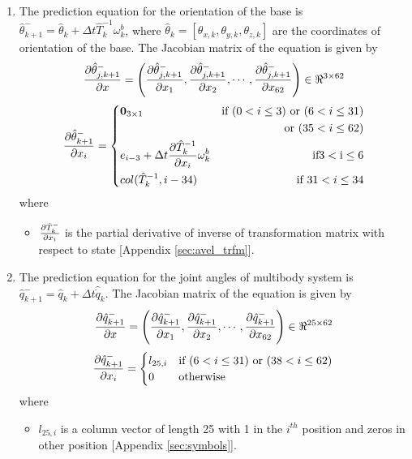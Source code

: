 \begin{enumerate}
\item The prediction equation for the orientation of the base is $\hat{\theta}_{k+1}^- = \hat{\theta}_k + \Delta t \hat T_k^{-1} \omega_k^b$, where $\hat \theta_k = [ \theta_{x,k},\theta_{y,k},\theta_{z,k}]$ are the coordinates of orientation of the base. The Jacobian matrix of the equation is given by
\begin{equation}
\label{eq:dthetadx}
\frac{\partial {\hat{\theta}_{j,k+1}^-}}{\partial {x}} = \left(\frac{\partial {\hat{\theta}_{j,k+1}^-}}{\partial {x_{1}}}, \frac{\partial {\hat{\theta}_{j,k+1}^-}}{\partial {x_{2}}}, \cdots , \frac{\partial {\hat{\theta}_{j,k+1}^-}}{\partial {x_{62}}}\right) \in \Re^{3 \times 62}
\end{equation}
\[
 \frac{\partial {\hat{\theta}_{k+1}^-}}{\partial {x_{i}}} = \left\lbrace
  \!\begin{aligned}
   &\textbf{0}_{3 \times 1} &\text{if }(0 < i \leq 3) \text{ or }(6 < i \leq 31) \\
   &\hspace{2cm} &\text{ or } (35 < i \leq 62) \\
   &e_{i-3} + \Delta t \frac{\partial {\hat T_k^{-1}}}{\partial {x_i}}\omega_k^b & \text{if}3< \text{i} \leq 6 \\
   &col(\hat T_k^{-1},i-34) & \text{if } 31 < i \leq 34 \\
  \end{aligned} \right.
\]where
\begin{itemize}
\item $\frac{\partial {\hat T_k^-}}{\partial {x_i}}$ is the partial derivative of inverse of transformation matrix with respect to state [Appendix \ref{sec:avel_trfm}].
\end{itemize}

\item The prediction equation for the joint angles of multibody system is  $\hat{q}_{k+1}^- = \hat{q}_k + \Delta t \hat {\dot{q}}_k $. The Jacobian matrix of the equation is given by
\begin{equation}
\label{eq:dqdx}
\frac{\partial {\hat{q}_{k+1}^-}}{\partial {x}} = \left(\frac{\partial {\hat{q}_{k+1}^-}}{\partial {x_{1}}}, \frac{\partial {\hat{q}_{k+1}^-}}{\partial {x_{2}}}, \cdots , \frac{\partial {\hat{q}_{k+1}^-}}{\partial {x_{62}}}\right) \in \Re^{25 \times 62}
\end{equation}
\[
\frac{\partial {\hat{q}_{k+1}^-}}{\partial {x_{i}}} = 
	\begin{cases}
	l_{25,i} & \text{if } (6 < i \leq 31) \text{ or } (38 < i \leq 62) \\
	0 & \text{otherwise}   \\
	\end{cases}
\]where
\begin{itemize}
\item $l_{25,i}$ is a column vector of length 25 with 1 in the $i^{th}$ position and zeros in other position [Appendix \ref{sec:symbols}].
\end{itemize}


\end{enumerate}
